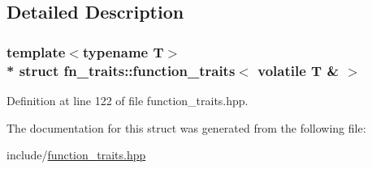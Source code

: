 \subsection{Detailed Description}
\subsubsection*{template$<$typename T$>$\\*
struct fn\+\_\+traits\+::function\+\_\+traits$<$ volatile T \& $>$}



Definition at line 122 of file function\+\_\+traits.\+hpp.



The documentation for this struct was generated from the following file\+:\begin{DoxyCompactItemize}
\item 
include/\hyperlink{function__traits_8hpp}{function\+\_\+traits.\+hpp}\end{DoxyCompactItemize}
